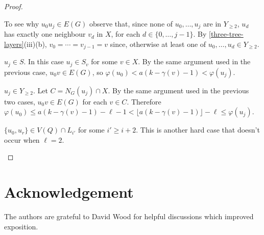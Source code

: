 \documentclass[kpfonts]{patmorin}
\theoremstyle{named}
\begin{document}
\begin{proof}
\begin{compactenum}[(1)]
\begin{compactenum}
            To see why $u_0u_j\in E(G)$ observe that, since none of $u_0,\ldots,u_j$ are in $Y_{\ge 2}$, $u_d$ has exactly one neighbour $v_d$ in $X$, for each $d\in\{0,\ldots,j-1\}$. By \cref{three-tree-layers}(iii)(b), $v_0=\cdots=v_{j-1}=v$ since, otherwise at least one of $u_0,\ldots,u_d\in Y_{\ge 2}$.

            \item $u_j\in S$.  In this case $u_j\in S_v$ for some $v\in X$.  By the same argument used in the previous case, $u_0v\in E(G)$, so $\varphi(u_0)<a(k-\gamma(v)-1)<\varphi(u_j)$.

            \item $u_j\in Y_{\ge 2}$. Let $C=N_G(u_j)\cap X$.  By the same argument used in the previous two cases, $u_0v\in E(G)$ for each $v\in C$.  Therefore $\varphi(u_0) \le a(k-\gamma(v)-1)-\ell-1 < \lfloor a(k-\gamma(v)-1)\rfloor-\ell \le \varphi(u_j)$.
        \end{compactenum}

        \item $\{u_0,u_r\}\in V(Q)\cap L_{i'}$ for some $i'\ge i+2$.  This is another hard case that doesn't occur when $\ell=2$.

    \end{compactenum}

\end{proof}


\section*{Acknowledgement}

The authors are grateful to David Wood for helpful discussions which improved exposition.



\end{document}
